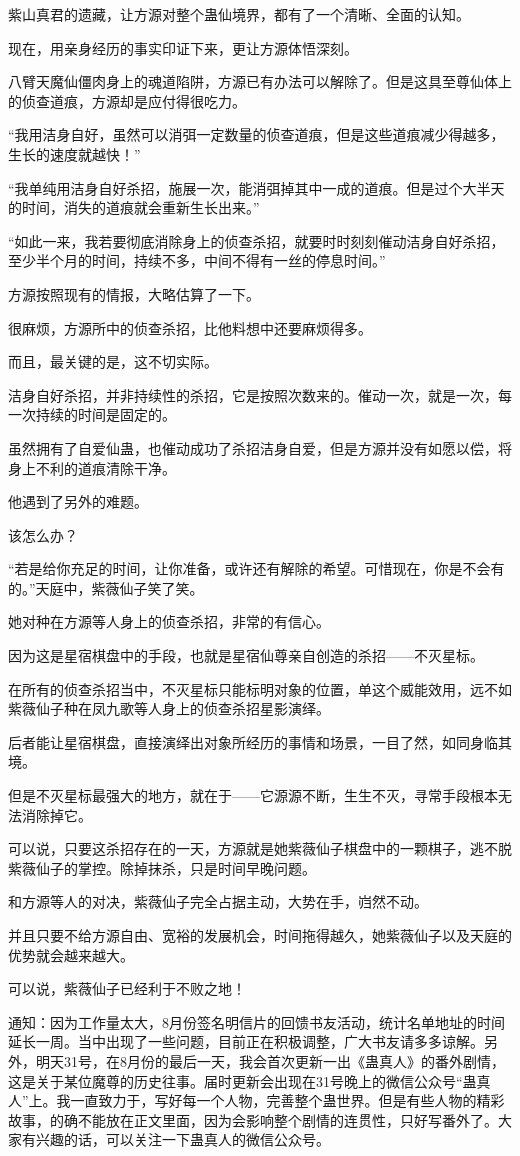 \begin{this_body}
紫山真君的遗藏，让方源对整个蛊仙境界，都有了一个清晰、全面的认知。

现在，用亲身经历的事实印证下来，更让方源体悟深刻。

八臂天魔仙僵肉身上的魂道陷阱，方源已有办法可以解除了。但是这具至尊仙体上的侦查道痕，方源却是应付得很吃力。

“我用洁身自好，虽然可以消弭一定数量的侦查道痕，但是这些道痕减少得越多，生长的速度就越快！”

“我单纯用洁身自好杀招，施展一次，能消弭掉其中一成的道痕。但是过个大半天的时间，消失的道痕就会重新生长出来。”

“如此一来，我若要彻底消除身上的侦查杀招，就要时时刻刻催动洁身自好杀招，至少半个月的时间，持续不多，中间不得有一丝的停息时间。”

方源按照现有的情报，大略估算了一下。

很麻烦，方源所中的侦查杀招，比他料想中还要麻烦得多。

而且，最关键的是，这不切实际。

洁身自好杀招，并非持续性的杀招，它是按照次数来的。催动一次，就是一次，每一次持续的时间是固定的。

虽然拥有了自爱仙蛊，也催动成功了杀招洁身自爱，但是方源并没有如愿以偿，将身上不利的道痕清除干净。

他遇到了另外的难题。

该怎么办？

“若是给你充足的时间，让你准备，或许还有解除的希望。可惜现在，你是不会有的。”天庭中，紫薇仙子笑了笑。

她对种在方源等人身上的侦查杀招，非常的有信心。

因为这是星宿棋盘中的手段，也就是星宿仙尊亲自创造的杀招——不灭星标。

在所有的侦查杀招当中，不灭星标只能标明对象的位置，单这个威能效用，远不如紫薇仙子种在凤九歌等人身上的侦查杀招星影演绎。

后者能让星宿棋盘，直接演绎出对象所经历的事情和场景，一目了然，如同身临其境。

但是不灭星标最强大的地方，就在于——它源源不断，生生不灭，寻常手段根本无法消除掉它。

可以说，只要这杀招存在的一天，方源就是她紫薇仙子棋盘中的一颗棋子，逃不脱紫薇仙子的掌控。除掉抹杀，只是时间早晚问题。

和方源等人的对决，紫薇仙子完全占据主动，大势在手，岿然不动。

并且只要不给方源自由、宽裕的发展机会，时间拖得越久，她紫薇仙子以及天庭的优势就会越来越大。

可以说，紫薇仙子已经利于不败之地！

通知：因为工作量太大，8月份签名明信片的回馈书友活动，统计名单地址的时间延长一周。当中出现了一些问题，目前正在积极调整，广大书友请多多谅解。另外，明天31号，在8月份的最后一天，我会首次更新一出《蛊真人》的番外剧情，这是关于某位魔尊的历史往事。届时更新会出现在31号晚上的微信公众号“蛊真人”上。我一直致力于，写好每一个人物，完善整个蛊世界。但是有些人物的精彩故事，的确不能放在正文里面，因为会影响整个剧情的连贯性，只好写番外了。大家有兴趣的话，可以关注一下蛊真人的微信公众号。

\end{this_body}

